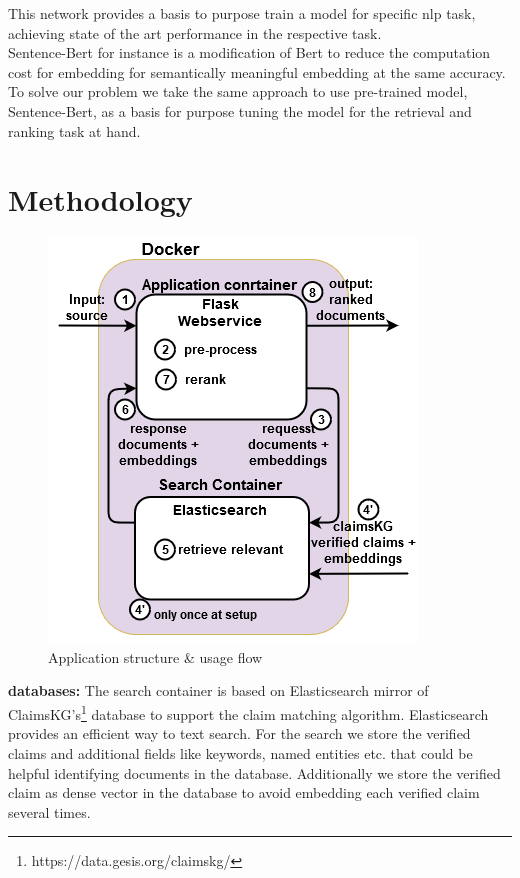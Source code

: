 \documentclass{article}
\begin{document}
This network provides a basis to purpose train a model for specific nlp task, achieving state of the art performance in the respective task.\\
Sentence-Bert\cite{DBLP:conf/emnlp/ReimersG19} for instance is a modification of Bert to reduce the computation cost for embedding for semantically meaningful embedding at the same accuracy.\\
To solve our problem we take the same approach to use pre-trained model, Sentence-Bert, as a basis for purpose tuning the model for the retrieval and ranking task at hand.
\section{Methodology}
\begin{figure}[h]
\includegraphics[scale=0.7]{App.png}
\caption{Application structure \& usage flow}
\end{figure}
\noindent\textbf{databases:} 
The search container is based on Elasticsearch mirror of ClaimsKG's\footnote{https://data.gesis.org/claimskg/ } database to support the claim matching algorithm.
Elasticsearch provides an efficient way to text search.
For the search we store the verified claims and additional fields like keywords, named entities etc. that could be helpful identifying documents in the database.
Additionally we  store the verified claim as dense vector in the database to avoid embedding each verified claim several times.
\end{document}

